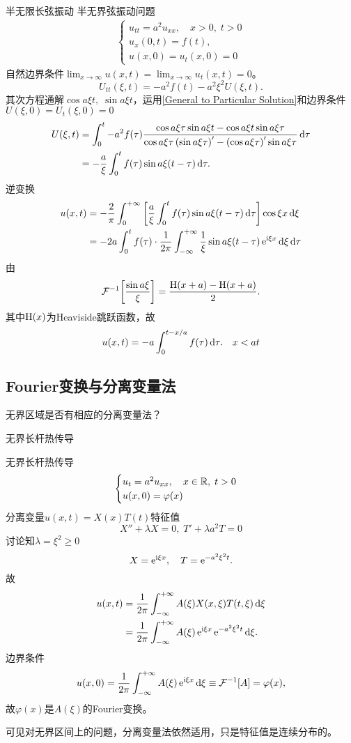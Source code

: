\begin{example}{半无限长弦振动}{}
	半无界弦振动问题
	\begin{align*}
		\begin{cases}
			u_{tt}=a^2u_{xx},\quad x>0,\;t>0\\
			u_x(0,t)=f(t),\\ %
			u(x,0)=u_t(x,0)=0
		\end{cases}
	\end{align*}
	自然边界条件$\lim_{x\to\infty}u(x,t)=\lim_{x\to\infty}u_t(x,t)=0$。
	\[
		U_{tt}(\xi,t)=-a^2f(t)-a^2\xi^2U(\xi,t).
	\]
	其次方程通解$\cos a\xi t,\;\sin a\xi t$，运用\eqref{General to Particular Solution}和边界条件$U(\xi,0)=U_t(\xi,0)=0$
	\begin{align*}
		U(\xi,t)&=\int_0^t-a^2f(\tau)\frac{\cos a\xi\tau\sin a\xi t-\cos a\xi t\sin a\xi\tau}{\cos a\xi\tau\left(\sin a\xi\tau\right)'-\left(\cos a\xi\tau\right)'\sin a\xi\tau}\mathop{}\!\mathrm{d}\tau\\
		&=-\frac a\xi\int_0^tf(\tau)\sin a\xi(t-\tau)\mathop{}\!\mathrm{d}\tau.
	\end{align*}
	逆变换
	\begin{align*}
		u(x,t)&=-\frac{2}\pi\int_0^{+\infty}\left[\frac a\xi\int_0^tf(\tau)\sin a\xi(t-\tau)\mathop{}\!\mathrm{d}\tau\right]\cos \xi x\mathop{}\!\mathrm{d}\xi\\
		&=-2a\int_0^tf(\tau)\cdot\frac1{2\pi}\int_{-\infty}^{+\infty}\frac1\xi\sin a\xi(t-\tau)\mathop{}\!\mathrm{e}^{\mathrm{i}\xi x}\mathop{}\!\mathrm{d}\xi\mathop{}\!\mathrm{d}\tau
	\end{align*}
	由
	\[
		\mathcal F_{\mathrm{{}}}^{-1}\!\left[\frac{\sin a\xi}\xi\right]=\frac{\operatorname{H}(x+a)-\operatorname{H}(x+a)}2.
	\]
	其中$\operatorname{H}(x)$为Heaviside跳跃函数，故
	\begin{align*}
		u(x,t) %
		=-a\int_0^{t-x/a}f(\tau)\d\tau.\quad x<at
	\end{align*}
\end{example}
\subsection{Fourier变换与分离变量法}
无界区域是否有相应的分离变量法？
\begin{example}{无界长杆热传导}{}
	
	无界长杆热传导
	\begin{align*}
		\begin{cases}
			u_t=a^2u_{xx},\quad x\in\mathbb R,\;t>0\\
			u(x,0)=\varphi(x)
		\end{cases}
	\end{align*}
	分离变量$u(x,t)=X(x)T(t)$特征值
	\[
		X''+\lambda X=0,\;T'+\lambda a^2T=0
	\]
	讨论知$\lambda=\xi^2\geqslant 0$
	\[
		X=\mathop{}\!\mathrm{e}^{\mathrm{i}\xi x},\quad T=\mathop{}\!\mathrm{e}^{-a^2\xi^2t}.
	\]
	故
	\begin{align*}
		u(x,t)&=\frac1{2\pi}\int_{-\infty}^{+\infty} A(\xi)X(x,\xi)T(t,\xi)\mathop{}\!\mathrm{d}\xi\\
		&=\frac1{2\pi}\int_{-\infty}^{+\infty} A(\xi)\mathop{}\!\mathrm{e}^{\mathrm{i}\xi x}\mathop{}\!\mathrm{e}^{-a^2\xi^2t}\mathop{}\!\mathrm{d}\xi.
	\end{align*}
	边界条件
	\[
		u(x,0)=\frac1{2\pi}\int_{-\infty}^{+\infty} A(\xi)\mathop{}\!\mathrm{e}^{\mathrm{i}\xi x}\mathop{}\!\mathrm{d}\xi\equiv\mathcal F_{\mathrm{{}}}^{-1}\!\left[A\right]=\varphi(x),
	\]
	故$\varphi(x)$是$A(\xi)$的Fourier变换。
\end{example}
可见对无界区间上的问题，分离变量法依然适用，只是特征值是连续分布的。
